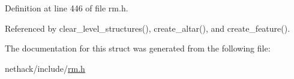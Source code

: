 Definition at line 446 of file rm.\+h.



Referenced by clear\+\_\+level\+\_\+structures(), create\+\_\+altar(), and create\+\_\+feature().



The documentation for this struct was generated from the following file\+:\begin{DoxyCompactItemize}
\item 
nethack/include/\hyperlink{rm_8h}{rm.\+h}\end{DoxyCompactItemize}
